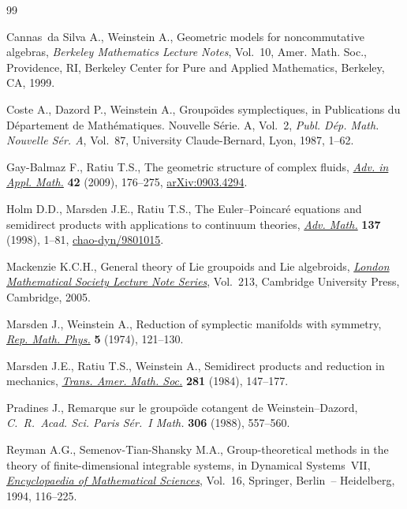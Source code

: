 \begin{thebibliography}{99}
\footnotesize\itemsep=0pt

Cannas~da Silva A., Weinstein A., Geometric models for noncommutative algebras,
 \textit{Berkeley Mathematics Lecture Notes}, Vol.~10, Amer. Math. Soc.,
 Providence, RI, Berkeley Center for Pure and Applied Mathematics, Berkeley,
 CA, 1999.

Coste A., Dazord P., Weinstein A., Groupo\"\i des symplectiques, in
 Publications du {D}\'epartement de {M}ath\'ematiques. {N}ouvelle {S}\'erie.
 {A}, {V}ol.~2, \textit{Publ. D\'ep. Math. Nouvelle S\'er. A}, Vol.~87,
 University Claude-Bernard, Lyon, 1987, 1--62.

Gay-Balmaz F., Ratiu T.S., The geometric structure of complex f\/luids,
 \href{https://doi.org/10.1016/j.aam.2008.06.002}{\textit{Adv. in Appl. Math.}} \textbf{42} (2009), 176--275,
 \href{https://arxiv.org/abs/0903.4294}{arXiv:0903.4294}.

Holm D.D., Marsden J.E., Ratiu T.S., The {E}uler--{P}oincar\'e equations and
 semidirect products with applications to continuum theories, \href{https://doi.org/10.1006/aima.1998.1721}{\textit{Adv.
 Math.}} \textbf{137} (1998), 1--81, \href{https://arxiv.org/abs/chao-dyn/9801015}{chao-dyn/9801015}.

Mackenzie K.C.H., General theory of {L}ie groupoids and {L}ie algebroids,
 \href{https://doi.org/10.1017/CBO9781107325883}{\textit{London Mathematical Society Lecture Note Series}}, Vol.~213, Cambridge
 University Press, Cambridge, 2005.

Marsden J., Weinstein A., Reduction of symplectic manifolds with symmetry,
 \href{https://doi.org/10.1016/0034-4877(74)90021-4}{\textit{Rep. Math. Phys.}} \textbf{5} (1974), 121--130.

Marsden J.E., Ratiu T.S., Weinstein A., Semidirect products and reduction in
 mechanics, \href{https://doi.org/10.2307/1999527}{\textit{Trans. Amer. Math. Soc.}} \textbf{281} (1984), 147--177.

Pradines J., Remarque sur le groupo\"{\i}de cotangent de {W}einstein--{D}azord,
 \textit{C.~R.~Acad. Sci. Paris S\'er.~I Math.} \textbf{306} (1988), 557--560.

Reyman A.G., Semenov-Tian-Shansky M.A., Group-theoretical methods in the theory
 of f\/inite-dimensional integrable systems, in Dynamical Systems~VII,
 \href{https://doi.org/10.1007/978-3-662-06796-3_7}{\textit{Encyclopaedia of Mathematical Sciences}}, Vol.~16, Springer, Berlin~--
 Heidelberg, 1994, 116--225.


\end{thebibliography}
